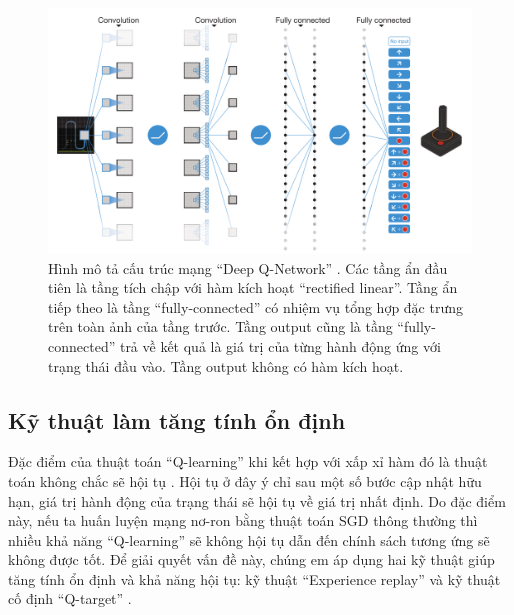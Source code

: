 	\begin{figure}
		\centering
		\includegraphics[width=\textwidth]{dqn}
		\caption[Cấu trúc mạng ``Deep Q-Network'']{Hình mô tả cấu trúc mạng ``Deep Q-Network'' \cite{mnihdqn2015}.
		Các tầng ẩn đầu tiên là tầng tích chập với hàm kích hoạt ``rectified linear''.
		Tầng ẩn tiếp theo là tầng ``fully-connected'' có nhiệm vụ tổng hợp đặc trưng trên toàn ảnh của tầng trước.
		Tầng output cũng là tầng ``fully-connected'' trả về kết quả là giá trị của từng hành động ứng với trạng thái đầu vào.
		Tầng output không có hàm kích hoạt.}
		\label{fig_dqn_nature}
	\end{figure}

\subsection{Kỹ thuật làm tăng tính ổn định}
	Đặc điểm của thuật toán ``Q-learning'' khi kết hợp với xấp xỉ hàm đó là thuật toán không chắc sẽ hội tụ \cite{sutton1998introduction}.
	Hội tụ ở đây ý chỉ sau một số bước cập nhật hữu hạn, giá trị hành động của trạng thái sẽ hội tụ về giá trị nhất định.
	Do đặc điểm này, nếu ta huấn luyện mạng nơ-ron bằng thuật toán SGD thông thường thì nhiều khả năng ``Q-learning'' sẽ không hội tụ dẫn đến chính sách tương ứng sẽ không được tốt.
	Để giải quyết vấn đề này, chúng em áp dụng hai kỹ thuật giúp tăng tính ổn định và khả năng hội tụ: kỹ thuật ``Experience replay'' \cite{lin1993reinforcement} và kỹ thuật cố định ``Q-target'' \cite{mnih2013playing}.
	
